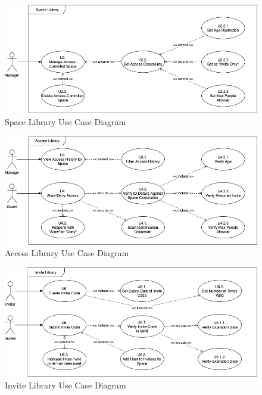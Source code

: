 \begin{figure}[H]
  \includegraphics[width=1.0\textwidth]{documentation/software_requirements_specification/subsystems/space_library_use_case.png}
  \caption{Space Library Use Case Diagram}
  \label{fig:space_library_use_case}
\end{figure}

\begin{figure}[H]
  \includegraphics[width=1.0\textwidth]{documentation/software_requirements_specification/subsystems/access_library_use_case.png}
  \caption{Access Library Use Case Diagram}
  \label{fig:access_library_use_case}
\end{figure}

\begin{figure}[H]
  \includegraphics[width=1.0\textwidth]{documentation/software_requirements_specification/subsystems/invite_library_use_case.png}
  \caption{Invite Library Use Case Diagram}
  \label{fig:invite_library_use_case}
\end{figure}

